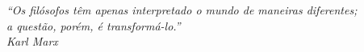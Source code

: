 

\begin{epigrafe}
\vspace*{\fill}
\begin{flushright}
\emph{“Os filósofos têm apenas interpretado o mundo de maneiras diferentes; 
  \\ a questão, porém, é transformá-lo.” 
  \\ Karl Marx}
\end{flushright}
\end{epigrafe}